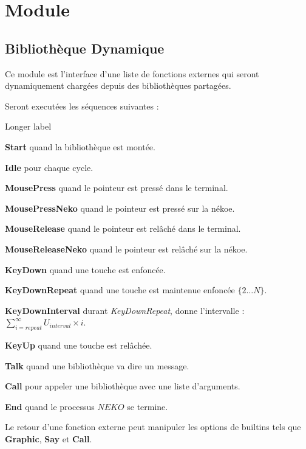 \documentclass{report}
\newcommand{\program}{\textit{NEKO}}
\begin{document}
\newpage

\section{Module}

\subsection{Bibliothèque Dynamique}

Ce module est l'interface d'une liste de fonctions externes qui seront dynamiquement chargées depuis des bibliothèques partagées.

Seront executées les séquences suivantes :

\begin{labeling}{Longer label\quad}
	\item[\textbf{Start} quand la bibliothèque est montée.]
	\item[\textbf{Idle} pour chaque cycle.]
	\item[\textbf{MousePress} quand le pointeur est pressé dans le terminal.]
	\item[\textbf{MousePressNeko} quand le pointeur est pressé sur la nékoe.]
	\item[\textbf{MouseRelease} quand le pointeur est relâché dans le terminal.]
	\item[\textbf{MouseReleaseNeko} quand le pointeur est relâché sur la nékoe.]
	\item[\textbf{KeyDown} quand une touche est enfoncée.]
	\item[\textbf{KeyDownRepeat} quand une touche est maintenue enfoncée $\{2\dots{}N\}$.]
	\item[\textbf{KeyDownInterval} durant \textit{KeyDownRepeat}, donne l'intervalle : $\sum_{i=repeat}^{\infty} U_{interval}\times{}i$.]
	\item[\textbf{KeyUp} quand une touche est relâchée.]
	\item[\textbf{Talk} quand une bibliothèque va dire un message.]
	\item[\textbf{Call} pour appeler une bibliothèque avec une liste d'arguments.]
	\item[\textbf{End} quand le processus $\program$ se termine.]
\end{labeling}

Le retour d'une fonction externe peut manipuler les options de builtins tels que \textbf{Graphic}, \textbf{Say} et \textbf{Call}.
\end{document}
